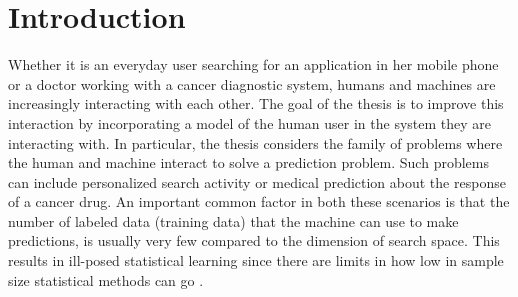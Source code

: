 \documentclass[dissertation,math,vertlayout,pdfa,colorlinks]{aaltoseries}
\begin{document}
\listofpublications






\chapter{Introduction}






Whether it is an everyday user searching for an application in her mobile phone or a doctor working with a cancer diagnostic system, humans and machines are increasingly interacting with each other. The goal of the thesis is to improve this interaction by incorporating a model of the human user in the system they are interacting with. In particular, the thesis considers the family of problems where the human and machine interact to solve a prediction problem. Such problems can include personalized search activity or medical prediction about the response of a cancer drug. An important common factor in both these scenarios is that the number of labeled data (training data) that the machine can use to make predictions, is usually very few compared to the dimension of search space. This results in ill-posed statistical learning since there are limits in how low in sample size statistical methods can go \cite{Donoho2009observed}. 
\end{document}
